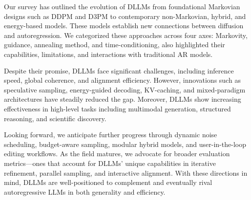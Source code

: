 Our survey has outlined the evolution of DLLMs from foundational Markovian designs such as DDPM and D3PM to contemporary non-Markovian, hybrid, and energy-based models. These models establish new connections between diffusion and autoregression. We categorized these approaches across four axes: Markovity, guidance, annealing method, and time-conditioning, also highlighted their capabilities, limitations, and interactions with traditional AR models.

Despite their promise, DLLMs face significant challenges, including inference speed, global coherence, and alignment efficiency. However, innovations such as speculative sampling, energy-guided decoding, KV-caching, and mixed-paradigm architectures have steadily reduced the gap. Moreover, DLLMs show increasing effectiveness in high-level tasks including multimodal generation, structured reasoning, and scientific discovery.

Looking forward, we anticipate further progress through dynamic noise scheduling, budget-aware sampling, modular hybrid models, and user-in-the-loop editing workflows. As the field matures, we advocate for broader evaluation metrics—ones that account for DLLMs’ unique capabilities in iterative refinement, parallel sampling, and interactive alignment. With these directions in mind, DLLMs are well-positioned to complement and eventually rival autoregressive LLMs in both generality and efficiency.
